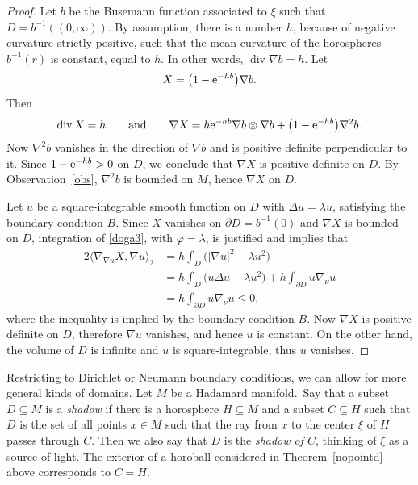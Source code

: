 \documentclass[pdftex]{sigma}
\numberwithin{equation}{section}
\DeclareMathOperator{\diver}{div}
\def\vf{\varphi}
\begin{document}
\begin{proof}
Let $b$ be the Busemann function associated to $\xi$ such that $D =b^{-1}((0,\infty))$.
By assumption, there is a number $h$, because of negative curvature strictly positive,
such that the mean curvature of the horospheres $b^{-1}(r)$ is constant, equal to $h$.
In other words, $\diver\nabla b=h$.
Let
\begin{align}\label{nopointd2}
X = \bigl(1 - {\rm e}^{-hb}\bigr)\nabla b.
\end{align}
Then
\begin{align*}%
 \diver X=h \qquad\text{and}\qquad
 \nabla X = h{\rm e}^{-hb} \nabla b\otimes\nabla b + \bigl(1 - {\rm e}^{-hb}\bigr)\nabla^2b.
\end{align*}
Now $\nabla^2b$ vanishes in the direction of $\nabla b$ and is positive definite perpendicular to it.
Since $1-{\rm e}^{-hb}>0$ on $D$, we conclude that $\nabla X$ is positive definite on $D$.
By Observation~\ref{obs}, $\nabla^2b$ is bounded on $M$, hence $\nabla X$ on $D$.

Let $u$ be a square-integrable smooth function on $D $ with $\Delta u=\lambda u$,
satisfying the boundary condition $B$.
Since $X$ vanishes on $\partial D=b^{-1}(0)$ and $\nabla X$ is bounded on $D$,
integration of \eqref{doga3}, with $\vf=\lambda$, is justified and implies that
\begin{align}
 2\langle\nabla_{\nabla u}X,\nabla u\rangle_2
 &= h\int_D \bigl(|\nabla u|^2 - \lambda u^2\bigr) \nonumber\\
 &= h\int_D \bigl(u\Delta u - \lambda u^2\bigr) + h\int_{\partial D }u\nabla_\nu u \nonumber\\
 &= h\int_{\partial D }u\nabla_\nu u \le 0,\label{nopointd6}
\end{align}
where the inequality is implied by the boundary condition $B$.
Now $\nabla X$ is positive definite on $D $, therefore $\nabla u$ vanishes, and hence $u$ is constant.
On the other hand, the volume of $D $ is infinite and $u$ is square-integrable, thus $u$ vanishes.
\end{proof}

Restricting to Dirichlet or Neumann boundary conditions, we can allow for more general kinds of domains.
Let $M$ be a Hadamard manifold.\
Say that a subset $D\subseteq M$ is a \emph{shadow} if there is a horosphere $H\subseteq M$
and a subset $C\subseteq H$ such that $D$ is the set of all points $x\in M$
such that the ray from $x$ to the center $\xi$ of $H$ passes through $C$.
Then we also say that $D$ is the \emph{shadow of $C$}, thinking of $\xi$ as a source of light.
The exterior of a horoball considered in Theorem~\ref{nopointd} above corresponds to $C=H$.
\end{document}

